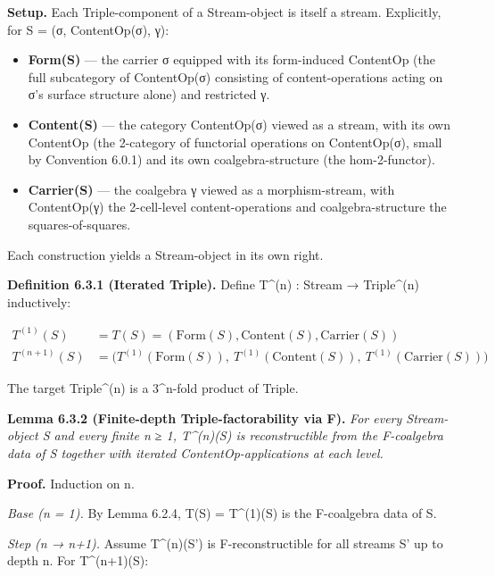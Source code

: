 \documentclass[11pt, openany]{book}
\begin{document}
\textbf{Setup.} Each Triple-component of a Stream-object is itself a stream. Explicitly, for S = (σ, ContentOp(σ), γ):

\begin{itemize}
\item \textbf{Form(S)} --- the carrier σ equipped with its form-induced ContentOp (the full subcategory of ContentOp(σ) consisting of content-operations acting on σ's surface structure alone) and restricted γ.
\item \textbf{Content(S)} --- the category ContentOp(σ) viewed as a stream, with its own ContentOp (the 2-category of functorial operations on ContentOp(σ), small by Convention 6.0.1) and its own coalgebra-structure (the hom-2-functor).
\item \textbf{Carrier(S)} --- the coalgebra γ viewed as a morphism-stream, with ContentOp(γ) the 2-cell-level content-operations and coalgebra-structure the squares-of-squares.
\end{itemize}

Each construction yields a Stream-object in its own right.

\textbf{Definition 6.3.1 (Iterated Triple).} Define T\textasciicircum{}(n) : Stream → Triple\textasciicircum{}(n) inductively:

\[
\begin{aligned}
T^{(1)}(S) & = T(S) = (\mathrm{Form}(S), \mathrm{Content}(S), \mathrm{Carrier}(S)) \\
T^{(n+1)}(S) & = \bigl(T^{(1)}(\mathrm{Form}(S)),\ T^{(1)}(\mathrm{Content}(S)),\ T^{(1)}(\mathrm{Carrier}(S))\bigr)
\end{aligned}
\]

The target Triple\textasciicircum{}(n) is a 3\textasciicircum{}n-fold product of Triple.

\textbf{Lemma 6.3.2 (Finite-depth Triple-factorability via F).} \textit{For every Stream-object S and every finite n ≥ 1, T\textasciicircum{}(n)(S) is reconstructible from the F-coalgebra data of S together with iterated ContentOp-applications at each level.}

\textbf{Proof.} Induction on n.

\textit{Base (n = 1).} By Lemma 6.2.4, T(S) = T\textasciicircum{}(1)(S) is the F-coalgebra data of S.

\textit{Step (n → n+1).} Assume T\textasciicircum{}(n)(S') is F-reconstructible for all streams S' up to depth n. For T\textasciicircum{}(n+1)(S):
\end{document}
